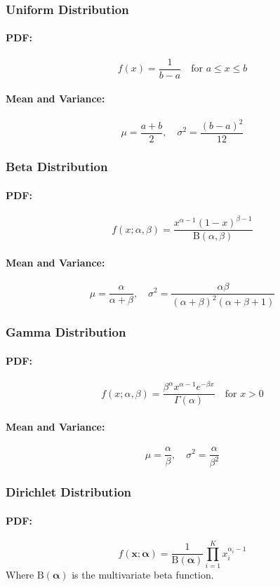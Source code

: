 \documentclass[8pt, a4paper, landscape, includeheadfoot]{extarticle}
\begin{document}
\begin{multicols*}{4}
	\subsubsection{Uniform Distribution}{}
	\paragraph{PDF:}
	$$
		f(x) = \frac{1}{b - a} \quad \text{for } a \leq x \leq b
	$$
	\paragraph{Mean and Variance:}
	$$
		\mu = \frac{a + b}{2}, \quad \sigma^2 = \frac{(b - a)^2}{12}
	$$

	\subsubsection{Beta Distribution}{}
	\paragraph{PDF:}
	$$
		f(x; \alpha, \beta) = \frac{x^{\alpha - 1} (1 - x)^{\beta - 1}}{\mathrm{B}(\alpha, \beta)}
	$$
	\paragraph{Mean and Variance:}
	$$
		\mu = \frac{\alpha}{\alpha + \beta}, \quad \sigma^2 = \frac{\alpha \beta}{(\alpha + \beta)^2 (\alpha + \beta + 1)}
	$$

	\subsubsection{Gamma Distribution}{}
	\paragraph{PDF:}
	$$
		f(x; \alpha, \beta) = \frac{\beta^\alpha x^{\alpha - 1} e^{-\beta x}}{\Gamma(\alpha)} \quad \text{for } x > 0
	$$
	\paragraph{Mean and Variance:}
	$$
		\mu = \frac{\alpha}{\beta}, \quad \sigma^2 = \frac{\alpha}{\beta^2}
	$$

	\subsubsection{Dirichlet Distribution}{}
	\paragraph{PDF:}
	$$
		f(\mathbf{x}; \boldsymbol{\alpha}) = \frac{1}{\mathrm{B}(\boldsymbol{\alpha})} \prod_{i=1}^{K} x_i^{\alpha_i - 1}
	$$
	Where $\mathrm{B}(\boldsymbol{\alpha})$ is the multivariate beta function.

\end{multicols*}
\end{document}
